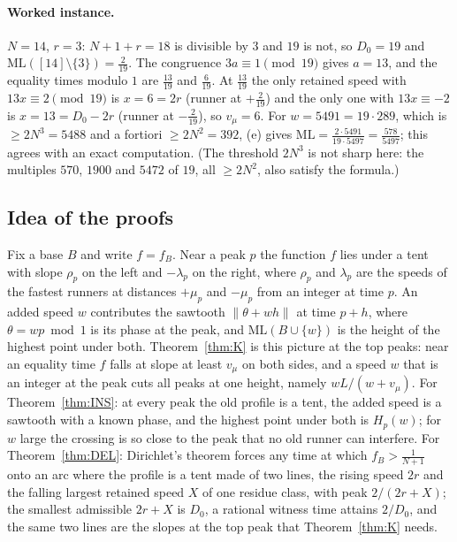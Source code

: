 \documentclass[11pt]{article}
\theoremstyle{definition}
\theoremstyle{remark}
\newcommand{\nd}[1]{\lVert #1\rVert}
\newcommand{\ML}{\mathrm{ML}}
\begin{document}
\paragraph{Worked instance.}
$N=14$, $r=3$: $N+1+r=18$ is divisible by $3$ and $19$ is not, so $D_0=19$ and $\ML([14]\setminus\{3\})=\frac2{19}$. The congruence $3a\equiv1\pmod{19}$ gives $a=13$, and the equality times modulo $1$ are $\frac{13}{19}$ and $\frac6{19}$. At $\frac{13}{19}$ the only retained speed with $13x\equiv2\pmod{19}$ is $x=6=2r$ (runner at $+\frac2{19}$) and the only one with $13x\equiv-2$ is $x=13=D_0-2r$ (runner at $-\frac2{19}$), so $v_\mu=6$. For $w=5491=19\cdot289$, which is $\ge2N^3=5488$ and a fortiori $\ge2N^2=392$, (e) gives $\ML=\frac{2\cdot5491}{19\cdot5497}=\frac{578}{5497}$; this agrees with an exact computation. (The threshold $2N^3$ is not sharp here: the multiples $570$, $1900$ and $5472$ of $19$, all $\ge2N^2$, also satisfy the formula.)


\subsection{Idea of the proofs}
Fix a base $B$ and write $f=f_B$. Near a peak $p$ the function $f$ lies under a tent with slope $\rho_p$ on the left and $-\lambda_p$ on the right, where $\rho_p$ and $\lambda_p$ are the speeds of the fastest runners at distances $+\mu_p$ and $-\mu_p$ from an integer at time $p$. An added speed $w$ contributes the sawtooth $\nd{\theta+wh}$ at time $p+h$, where $\theta=wp\bmod1$ is its phase at the peak, and $\ML(B\cup\{w\})$ is the height of the highest point under both. Theorem~\ref{thm:K} is this picture at the top peaks: near an equality time $f$ falls at slope at least $v_\mu$ on both sides, and a speed $w$ that is an integer at the peak cuts all peaks at one height, namely $wL/(w+v_\mu)$. For Theorem~\ref{thm:INS}: at every peak the old profile is a tent, the added speed is a sawtooth with a known phase, and the highest point under both is $H_p(w)$; for $w$ large the crossing is so close to the peak that no old runner can interfere. For Theorem~\ref{thm:DEL}: Dirichlet's theorem forces any time at which $f_B>\frac1{N+1}$ onto an arc where the profile is a tent made of two lines, the rising speed $2r$ and the falling largest retained speed $X$ of one residue class, with peak $2/(2r+X)$; the smallest admissible $2r+X$ is $D_0$, a rational witness time attains $2/D_0$, and the same two lines are the slopes at the top peak that Theorem~\ref{thm:K} needs.
\end{document}

